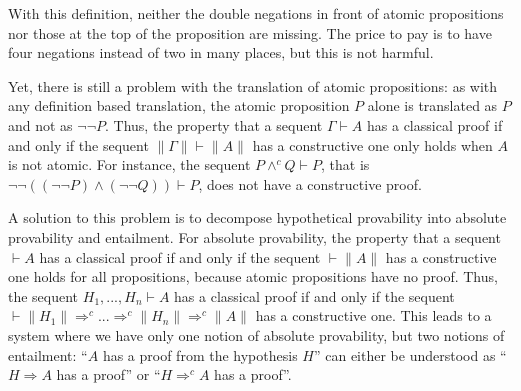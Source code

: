 \documentclass{article}
\newcommand{\wedgec}{\wedge^c}
\newcommand{\Rightarrowc}{\Rightarrow^c}
\begin{document}
With this definition, neither the double negations in front of atomic
propositions nor those at the top of the proposition are missing. The
price to pay is to have four negations instead of two in many places,
but this is not harmful.

Yet, there is still a problem with the translation of atomic
propositions: as with any definition based translation, the atomic
proposition $P$ alone is translated as $P$ and not as $\neg \neg P$.
Thus, the property that a sequent $\Gamma \vdash A$ has a classical
proof if and only if the sequent $\|\Gamma\| \vdash \|A\|$ has a
constructive one only holds when $A$ is not atomic. For instance, the
sequent $P \wedgec Q \vdash P$, that is $\neg \neg ((\neg \neg P)
\wedge (\neg \neg Q)) \vdash P$, does not have a constructive proof.

A solution to this problem is to decompose hypothetical provability into
absolute provability and entailment. For absolute provability, 
the property that a sequent $\vdash A$ has a classical proof if and only if 
the sequent $\vdash \|A\|$ has a constructive one holds for all propositions,
because atomic propositions have no proof.
Thus, the sequent
$H_1, ..., H_n \vdash A$ has a classical proof if and only if the
sequent $\vdash \|H_1\| \Rightarrow^c ...\Rightarrow^c \|H_n\|
\Rightarrow^c \|A\|$ has a constructive one. This leads to a system where 
we have only one notion of absolute provability, but two notions of entailment:
``$A$ has a proof from the hypothesis $H$'' can either be understood
as ``$H \Rightarrow A$ has a proof'' or ``$H \Rightarrowc A$ has a
proof''.
\end{document}
